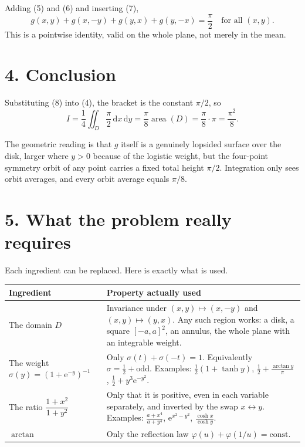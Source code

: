 \documentclass[12pt]{article}
\newcommand{\dd}{\,\mathrm{d}}
\newcommand{\e}{\mathrm{e}}
\newcommand{\D}{D}
\begin{document}
Adding (5) and (6) and inserting (7),
\[
\boxed{\displaystyle
g(x,y)+g(x,-y)+g(y,x)+g(y,-x)=\frac\pi2
\quad\text{for all }(x,y).}
\tag{8}
\]
This is a pointwise identity, valid on the whole plane, not merely in the
mean.

\section*{4. Conclusion}

Substituting (8) into (4), the bracket is the constant \(\pi/2\), so
\[
I=\frac14\iint_\D\frac\pi2\dd x\dd y
=\frac\pi8\operatorname{area}(\D)
=\frac\pi8\cdot\pi
=\frac{\pi^2}{8}.
\]

The geometric reading is that \(g\) itself is a genuinely lopsided
surface over the disk, larger where \(y>0\) because of the
logistic weight, but the four-point symmetry orbit of any point
carries a fixed total height \(\pi/2\). Integration only sees orbit
averages, and every orbit average equals \(\pi/8\).

\section*{5. What the problem really requires}

Each ingredient can be replaced. Here is exactly what is used.

\begin{center}
\small
\renewcommand{\arraystretch}{1.4}
\begin{tabularx}{\textwidth}{@{}>{\raggedright\arraybackslash}p{}X@{}}
\toprule
Ingredient & Property actually used \\
\midrule
The domain \(\D\)
& Invariance under \((x,y)\mapsto(x,-y)\) and \((x,y)\mapsto(y,x)\).
Any such region works: a disk, a square \([-a,a]^2\), an annulus, the
whole plane with an integrable weight. \\
\addlinespace
The weight \(\sigma(y)=(1+\e^{-y})^{-1}\)
& Only \(\sigma(t)+\sigma(-t)=1\). Equivalently
\(\sigma=\frac12+\text{odd}\). Examples:
\(\frac12(1+\tanh y)\), \(\frac12+\frac{\arctan y}{\pi}\),
\(\frac12+y^3\e^{-y^2}\). \\
\addlinespace
The ratio \(\dfrac{1+x^2}{1+y^2}\)
& Only that it is positive, even in each variable separately, and
inverted by the swap \(x\leftrightarrow y\). Examples:
\(\frac{a+x^4}{a+y^4}\), \(\e^{x^2-y^2}\), \(\frac{\cosh x}{\cosh y}\). \\
\addlinespace
\(\arctan\)
& Only the reflection law \(\varphi(u)+\varphi(1/u)=\text{const}\). \\
\bottomrule
\end{tabularx}
\end{center}
\end{document}
